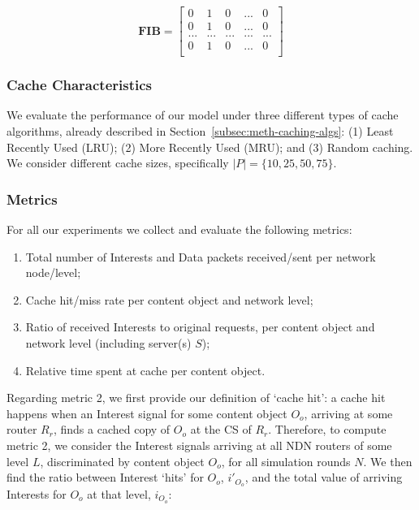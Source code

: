 \begin{equation}
\textbf{FIB} = \begin{bmatrix} 
                0 & 1 & 0 & ... & 0                 \\ 
                0 & 1 & 0 & ... & 0                 \\ 
                ... & ... & ... & ... & ...         \\ 
                0 & 1 & 0 & ... & 0                 \\ \end{bmatrix}
    \label{eq:fib-exp}
\end{equation}\shortvertbreak

\subsubsection{Cache Characteristics}
\label{subsec:exp-setup-cache}

We evaluate the performance of our model under three different types of cache 
algorithms, already described in Section~\ref{subsec:meth-caching-algs}: (1) 
Least Recently Used (LRU); (2) More Recently Used (MRU); and (3) Random caching. We 
consider different cache sizes, specifically $|P| = \{10, 25, 50, 75\}$.\shortvertbreak

\subsubsection{Metrics}
\label{subsec:exp-setup-metrics}

For all our experiments we collect and evaluate the following metrics:

\begin{enumerate}

    \item Total number of Interests and Data packets received\slash sent per network node\slash level;
    \item Cache hit\slash miss rate per content object and network level;
    \item Ratio of received Interests to original requests, per content object 
        and network level (including server(s) $S$);
    \item Relative time spent at cache per content object.\shortvertbreak

\end{enumerate}

Regarding metric 2, we first provide our definition of `cache hit': a cache hit 
happens when an Interest signal for some content object $O_o$, arriving at some 
router $R_r$, finds a cached copy of $O_o$ at the CS of $R_r$. Therefore, to 
compute metric 2, we consider the Interest signals 
arriving at all NDN routers of some level $L$, discriminated by content 
object $O_o$, for all simulation rounds $N$. We then find the ratio between Interest 
`hits' for $O_o$, $i'_{O_o}$, and the total value of arriving Interests for $O_o$ at that 
level, $i_{O_o}$:

